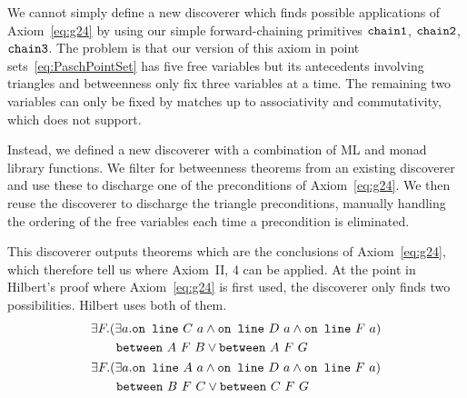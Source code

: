We cannot simply define a new discoverer which finds possible applications of Axiom~\ref{eq:g24} by using our simple forward-chaining primitives $\texttt{chain1}$, $\texttt{chain2}$, $\texttt{chain3}$. The problem is that our version of this axiom in point sets~\eqref{eq:PaschPointSet} has five free variables but its antecedents involving triangles and betweenness only fix three variables at a time. The remaining two variables can only be fixed by matches up to associativity and commutativity, which  does not support.

Instead, we defined a new discoverer  with a combination of ML and monad library functions. We filter for betweenness theorems from an existing discoverer and use these to discharge one of the preconditions of Axiom~\ref{eq:g24}. We then reuse the discoverer  to discharge the triangle preconditions, manually handling the ordering of the free variables each time a precondition is eliminated. 

This discoverer outputs theorems which are the conclusions of Axiom~\ref{eq:g24}, which therefore tell us where Axiom~II, 4 can be applied. At the point in Hilbert's proof where Axiom~\ref{eq:g24} is first used, the discoverer only finds two possibilities. Hilbert uses both of them.
\begin{gather*}
\begin{split}
&\exists F. (\exists a. \code{on\ line}\ C\ a \wedge \code{on\ line}\ D\ a \wedge \code{on\ line}\ F\ a)\\
&\qquad \between{A}{F}{B} \vee \between{A}{F}{G} 
\end{split}\\
\begin{split}
&\exists F. (\exists a. \code{on\ line}\ A\ a \wedge \code{on\ line}\ D\ a \wedge \code{on\ line}\ F\ a)\\
&\qquad \between{B}{F}{C} \vee \between{C}{F}{G} 
\end{split}
\end{gather*}

